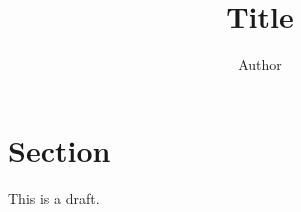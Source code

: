 \documentclass{article}
\begin{document}
\title{Title}
\author{Author}
\maketitle

\section{Section}

This is a draft.
\end{document}
